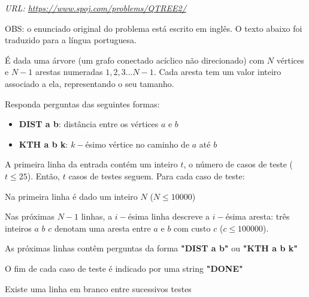 {

\textit{URL: \url{https://www.spoj.com/problems/QTREE2/}}

\vspace{0.3cm}OBS: o enunciado original do problema está escrito em inglês. O texto abaixo foi traduzido para a língua portuguesa.\vspace{0.3cm}

\begin{mdframed}[backgroundcolor=blue!5]
\vspace{-0.5cm}

\vspace{0.2cm}

É dada uma árvore (um grafo conectado acíclico não direcionado) com $N$ vértices e $N-1$ arestas numeradas $1, 2, 3...N-1$. Cada aresta tem um valor inteiro associado a ela, representando o seu tamanho.

Responda perguntas das seguintes formas:

\begin{itemize}
    \item \textbf{DIST a b}: distância entre os vértices $a$ e $b$
    \item \textbf{KTH a b k}: $k-$ésimo vértice no caminho de $a$ até $b$
\end{itemize}

\vspace{0.2cm}

A primeira linha da entrada contém um inteiro $t$, o número de casos de teste ($t \leq 25$). Então, $t$ casos de testes seguem. Para cada caso de teste: \vspace{0.1cm}

Na primeira linha é dado um inteiro $N$ ($N \leq 10000$)

Nas próximas $N-1$ linhas, a $i-$ésima linha descreve a $i-$ésima aresta: três inteiros $a$ $b$ $c$ denotam uma aresta entre $a$ e $b$ com custo $c$ ($c \leq 100000$).

As próximas linhas contêm perguntas da forma \textbf{"DIST a b"} ou \textbf{"KTH a b k"}

O fim de cada caso de teste é indicado por uma string \textbf{"DONE"}

Existe uma linha em branco entre sucessivos testes

\vspace{0.2cm}


\end{mdframed}}
